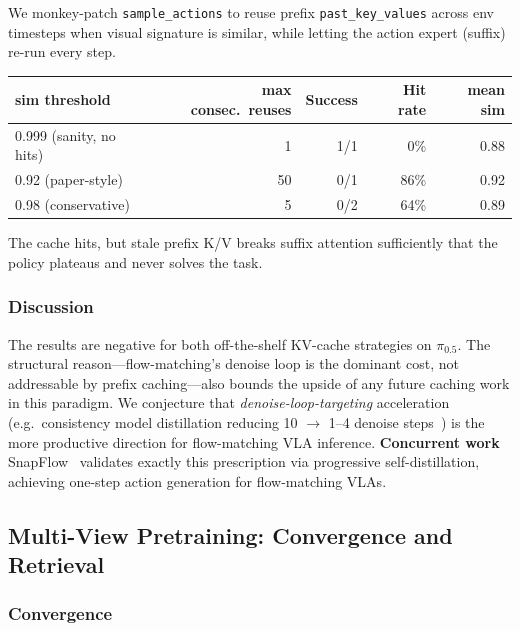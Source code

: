 \documentclass{article}
\begin{document}
We monkey-patch \texttt{sample\_actions} to reuse prefix \texttt{past\_key\_values} across env timesteps when visual signature is similar, while letting the action expert (suffix) re-run every step.

\begin{table}[ht]
\centering
\begin{tabular}{lrrrr}
\toprule
sim threshold & max consec.\ reuses & Success & Hit rate & mean sim \\
\midrule
0.999 (sanity, no hits) & 1 & 1/1 & 0\% & 0.88 \\
0.92 (paper-style) & 50 & 0/1 & 86\% & 0.92 \\
0.98 (conservative) & 5 & 0/2 & 64\% & 0.89 \\
\bottomrule
\end{tabular}
\end{table}

The cache hits, but stale prefix K/V breaks suffix attention sufficiently that the policy plateaus and never solves the task.

\subsubsection*{Discussion}

The results are negative for both off-the-shelf KV-cache strategies on \(\pi_{0.5}\). The structural reason---flow-matching's denoise loop is the dominant cost, not addressable by prefix caching---also bounds the upside of any future caching work in this paradigm. We conjecture that \emph{denoise-loop-targeting} acceleration (e.g.\ consistency model distillation reducing 10 \(\rightarrow\) 1--4 denoise steps~\cite{salimans2022progressive,song2023consistency,lu2024simpleconsistency}) is the more productive direction for flow-matching VLA inference. \textbf{Concurrent work} SnapFlow~\cite{snapflow2026} validates exactly this prescription via progressive self-distillation, achieving one-step action generation for flow-matching VLAs.

\subsection{Multi-View Pretraining: Convergence and Retrieval}

\subsubsection*{Convergence}
\end{document}
